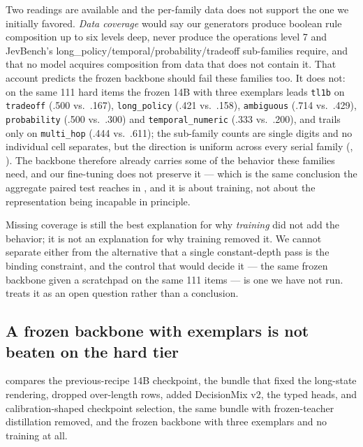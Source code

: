 Two readings are available and the per-family data does not support the one we initially favored.
\emph{Data coverage} would say our generators produce boolean rule composition up to six levels deep,
never produce the operations level 7 and JevBench's long\_policy/temporal/probability/tradeoff
sub-families require, and that no model acquires composition from data that does not contain it. That
account predicts the frozen backbone should fail these families too. It does not: on the same 111 hard
items the frozen 14B with three exemplars leads \texttt{tl1b} on \texttt{tradeoff} (.500 vs.\ .167),
\texttt{long\_policy} (.421 vs.\ .158), \texttt{ambiguous} (.714 vs.\ .429), \texttt{probability}
(.500 vs.\ .300) and \texttt{temporal\_numeric} (.333 vs.\ .200), and trails only on
\texttt{multi\_hop} (.444 vs.\ .611); the sub-family counts are single digits and no individual cell
separates, but the direction is uniform across every serial family
(, ). The backbone therefore already carries some of
the behavior these families need, and our fine-tuning does not preserve it --- which is the same
conclusion the aggregate paired test reaches in , and it is about training,
not about the representation being incapable in principle.

Missing coverage is still the best explanation for why \emph{training} did not add the behavior; it is
not an explanation for why training removed it. We cannot separate either from the alternative that a
single constant-depth pass is the binding constraint, and the control that would decide it --- the
same frozen backbone given a scratchpad on the same 111 items --- is one we have not run.
 treats it as an open question rather than a conclusion.

\subsection{A frozen backbone with exemplars is not beaten on the hard tier}
\label{sec:boundary:frozen}

 compares the previous-recipe 14B checkpoint, the bundle that fixed the long-state
rendering, dropped over-length rows, added DecisionMix v2, the typed heads, and calibration-shaped
checkpoint selection, the same bundle with frozen-teacher distillation removed, and the frozen backbone
with three exemplars and no training at all.

